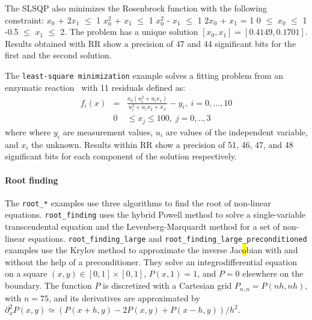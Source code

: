 \documentclass[10pt,journal,compsoc]{IEEEtran}
\DeclareRobustCommand{\add}[1]{{\sethlcolor{lightgreen}\hl{#1}}}
\begin{document}
The SLSQP also minimizes the Rosenbrock function with the following constraint:
$x_0$ + $2x_1$ $\leq$ 1 
$x_0^2$ + $x_1$ $\leq$ 1 
$x_0^2$ - $x_1$ $\leq$ 1 
$2x_0$ + $x_1$ = 1 
0 $\leq$ $x_0$ $\leq$ 1 
-0.5 $\leq$ $x_1$ $\leq$ 2. 
The problem has a unique solution $[x_0, x_1] = [0.4149, 0.1701]$. Results
obtained with RR show a precision of 47 and 44 significant bits for the first
and the second solution. %

The \texttt{least-square minimization} example solves a fitting problem from an enzymatic reaction~\cite{kowalik1968analysis} with 11 residuals defined as:
\begin{eqnarray*}
    f_i(x) &=& \frac{x_0(u_i^2 + u_ix_1)}{u_i^2 + u_ix_2+x_3}-y_i,\; i=0,...,10 \\
    &0& \leq x_j \leq 100,\; j=0,..,3
\end{eqnarray*}
where where $y_i$ are measurement values, $u_i$ are values of the independent
variable, and $x_i$ the unknown. Results within RR show a precision of 51, 46,
47, and 48 significant bits for each component of the solution
respectively.%

\paragraph{Root finding}

The \texttt{root\_*} examples use three algorithms to find the root of
non-linear equations. \texttt{root\_finding} uses the hybrid Powell method to
solve a single-variable transcendental equation and the Levenberg-Marquardt
method for a set of non-linear equations. \texttt{root\_finding\_large} and
\texttt{root\_finding\_large\_preconditioned} examples use the Krylov method to
approximate the inverse Jac\add{o}bian with and without the help of a preconditioner.
They solve an integrodifferential equation on a square $(x,y) \in [0,1] \times
    [0,1]$, $P(x,1)=1$, and $P=0$ elsewhere on the boundary. The function $P$ is
discretized with a Cartesian grid $P_{n,n}=P(nh,nh)$, with $n=75$, and its
derivatives are approximated by $\partial_x^2P(x,y) \simeq (P(x+h,y) - 2P(x,y) +
    P(x-h,y))/h^2$.
\end{document}
